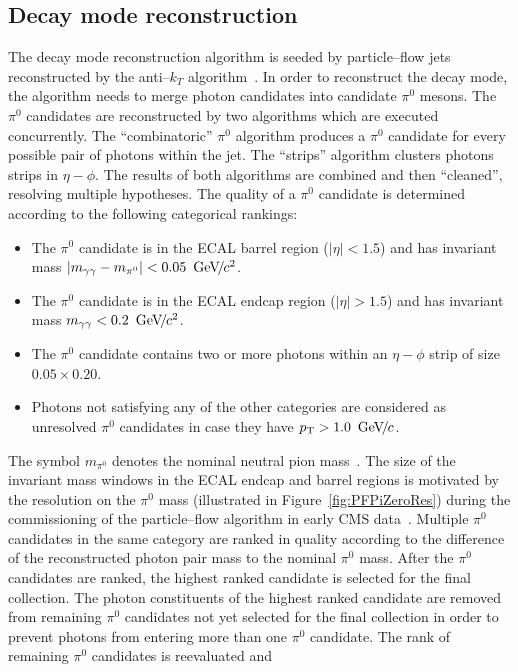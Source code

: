 \subsection{Decay mode reconstruction}
%
The decay mode reconstruction algorithm is seeded by particle--flow jets
reconstructed by the anti--$k_{T}$ algorithm~\cite{AntiKT}.  In order to
reconstruct the decay mode, the algorithm needs to merge photon candidates into
candidate $\pi^0$ mesons.  The $\pi^0$ candidates are reconstructed by two
algorithms which are executed concurrently.  The ``combinatoric'' $\pi^0$
algorithm produces a $\pi^0$ candidate for every possible pair of photons within
the jet.  The ``strips'' algorithm clusters photons strips in $\eta-\phi$.  The
results of both algorithms are combined and then ``cleaned'', resolving multiple
hypotheses.  The quality of a $\pi^0$ candidate is determined according to the
following categorical rankings:
\begin{itemize}
\item The $\pi^0$ candidate is in the ECAL barrel region ($|\eta| < 1.5$) 
and has invariant mass $|m_{\gamma \gamma} - m_{\pi^0}| < 0.05~{\,\text{Ge\hspace{-.08em}V\hspace{-0.16em}/\hspace{-0.08em}}c^\text{2}}$.
\item The $\pi^0$ candidate is in the ECAL endcap region ($|\eta| > 1.5$)
 and has invariant mass $m_{\gamma \gamma} < 0.2~{\,\text{Ge\hspace{-.08em}V\hspace{-0.16em}/\hspace{-0.08em}}c^\text{2}}$.
\item The $\pi^0$ candidate contains two or more photons within an $\eta-\phi$ strip of size $0.05 \times 0.20$.
\item Photons not satisfying any of the other categories are considered as
  unresolved $\pi^0$ candidates in case they have $p_{\mathrm{T}} > 1.0~{\,\text{Ge\hspace{-.08em}V\hspace{-0.16em}/\hspace{-0.08em}}c}$.
\end{itemize}  
The symbol $m_{\pi^0}$ denotes the nominal neutral pion mass~\cite{PDG}.  The
size of the invariant mass windows in the ECAL endcap and barrel regions is
motivated by the resolution on the $\pi^0$ mass (illustrated in
Figure~\ref{fig:PFPiZeroRes}) during the commissioning of the particle--flow
algorithm in early CMS data~\cite{CMS-PAS-PFT-10-002}.  Multiple $\pi^0$
candidates in the same category are ranked in quality according to the
difference of the reconstructed photon pair mass to the nominal $\pi^0$ mass.
After the $\pi^0$ candidates are ranked, the highest ranked candidate is
selected for the final collection.  The photon constituents of the highest
ranked candidate are removed from remaining $\pi^0$ candidates not yet selected
for the final collection in order to prevent photons from entering more than one
$\pi^0$ candidate.  The rank of remaining $\pi^0$ candidates is reevaluated and

